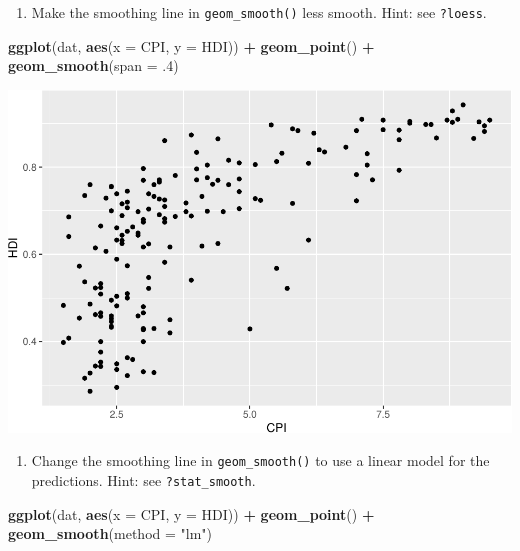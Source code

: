 \documentclass[
]{book}
\newenvironment{Shaded}{\begin{snugshade}}{\end{snugshade}}
\newcommand{\DataTypeTok}[1]{\textcolor[rgb]{0.13,0.29,0.53}{#1}}
\newcommand{\FloatTok}[1]{\textcolor[rgb]{0.00,0.00,0.81}{#1}}
\newcommand{\KeywordTok}[1]{\textcolor[rgb]{0.13,0.29,0.53}{\textbf{#1}}}
\newcommand{\NormalTok}[1]{#1}
\newcommand{\OperatorTok}[1]{\textcolor[rgb]{0.81,0.36,0.00}{\textbf{#1}}}
\newcommand{\StringTok}[1]{\textcolor[rgb]{0.31,0.60,0.02}{#1}}
\providecommand{\tightlist}{%
  \setlength{\itemsep}{0pt}\setlength{\parskip}{0pt}}
\begin{document}
\begin{enumerate}
\def\labelenumi{\arabic{enumi}.}
\setcounter{enumi}{2}
\tightlist
\item
  Make the smoothing line in \texttt{geom\_smooth()} less smooth. Hint: see \texttt{?loess}.
\end{enumerate}

\begin{Shaded}
\begin{Highlighting}[]
\KeywordTok{ggplot}\NormalTok{(dat, }\KeywordTok{aes}\NormalTok{(}\DataTypeTok{x =}\NormalTok{ CPI, }\DataTypeTok{y =}\NormalTok{ HDI)) }\OperatorTok{+}
\StringTok{  }\KeywordTok{geom\_point}\NormalTok{() }\OperatorTok{+}
\StringTok{  }\KeywordTok{geom\_smooth}\NormalTok{(}\DataTypeTok{span =} \FloatTok{.4}\NormalTok{)}
\end{Highlighting}
\end{Shaded}

\includegraphics{R/Rgraphics/figures/unnamed-chunk-194-1.pdf}

\begin{enumerate}
\def\labelenumi{\arabic{enumi}.}
\setcounter{enumi}{3}
\tightlist
\item
  Change the smoothing line in \texttt{geom\_smooth()} to use a linear model for the predictions. Hint: see \texttt{?stat\_smooth}.
\end{enumerate}

\begin{Shaded}
\begin{Highlighting}[]
\KeywordTok{ggplot}\NormalTok{(dat, }\KeywordTok{aes}\NormalTok{(}\DataTypeTok{x =}\NormalTok{ CPI, }\DataTypeTok{y =}\NormalTok{ HDI)) }\OperatorTok{+}
\StringTok{  }\KeywordTok{geom\_point}\NormalTok{() }\OperatorTok{+}
\StringTok{  }\KeywordTok{geom\_smooth}\NormalTok{(}\DataTypeTok{method =} \StringTok{"lm"}\NormalTok{)}
\end{Highlighting}
\end{Shaded}
\end{document}
